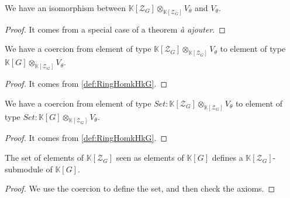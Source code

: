 \begin{proposition}
    \label{prop:module_sub_rep_iso}
    \leanok
    We have an isomorphism between $\mathbb{K}[\mathcal{Z}_G]\otimes_{\mathbb{K}[\mathcal{Z}_G]}V_\theta$ and $V_\theta$.
\end{proposition}
\begin{proof}
    \leanok
    It comes from a special case of a theorem \textit{à ajouter}.
\end{proof}

\begin{proposition}[Coercion]
    \label{prop:induced_rep_coe}
    \leanok 
   We have a coercion from element of type $\mathbb{K}[\mathcal{Z}_G]\otimes_{\mathbb{K}[\mathcal{Z}_G]}V_\theta$
   to element of type $\mathbb{K}[G]\otimes_{\mathbb{K}[\mathcal{Z}_G]}V_\theta$.
\end{proposition}
\begin{proof}
    \leanok
    It comes from \ref{def:RingHomkHkG}.
\end{proof}

\begin{proposition}
    \label{prop:induced_rep_coe_set}
    \leanok 
   We have a coercion from element of type $Set : \mathbb{K}[\mathcal{Z}_G]\otimes_{\mathbb{K}[\mathcal{Z}_G]}V_\theta$
   to element of type $Set : \mathbb{K}[G]\otimes_{\mathbb{K}[\mathcal{Z}_G]}V_\theta$.
\end{proposition}
\begin{proof}
    \leanok
    It comes from \ref{def:RingHomkHkG}.
\end{proof}

\begin{proposition}
    \label{prop:center_submodule}
    \leanok 
    The set of elements of $\mathbb{K}[\mathcal{Z}_G]$ seen as elements of $\mathbb{K}[G]$
    defines a $\mathbb{K}[\mathcal{Z}_G]$-submodule of $\mathbb{K}[G]$.
\end{proposition}
\begin{proof}
    \leanok
    We use the coercion to define the set, and then check the axioms.
\end{proof}

